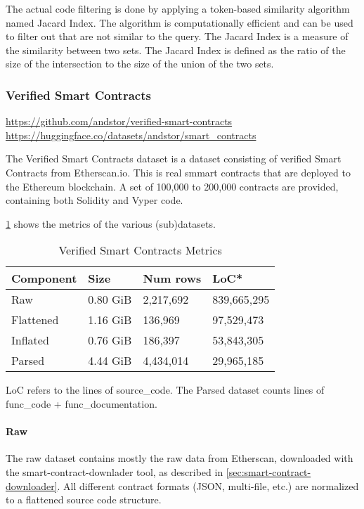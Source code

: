 The actual code filtering is done by applying a token-based similarity algorithm named Jacard Index. The algorithm is computationally efficient and can be used to filter out  that are not similar to the query. The Jacard Index is a measure of the similarity between two sets. The Jacard Index is defined as the ratio of the size of the intersection to the size of the union of the two sets.

\subsubsection{Verified Smart Contracts}
\label{sec:verified-smart-contracts}
\url{https://github.com/andstor/verified-smart-contracts}
\url{https://huggingface.co/datasets/andstor/smart_contracts}

The Verified Smart Contracts dataset is a dataset consisting of verified Smart Contracts from Etherscan.io. This is real smmart contracts that are deployed to the Ethereum blockchain. A set of 100,000 to 200,000 contracts are provided, containing both Solidity and Vyper code.

\cref{tab:verified-smart-contracts-metrics} shows the metrics of the various (sub)datasets.

\begin{table}
    \def\arraystretch{1.5}
    \small
    \centering
    \caption{Verified Smart Contracts Metrics}
    \label{tab:verified-smart-contracts-metrics}
    \begin{tabularx}{\textwidth}{XXXX}
        \toprule
        \textbf{Component} & \textbf{Size} &  \textbf{Num rows} & \textbf{LoC*}\\
        \midrule
        Raw & 0.80 GiB & 2,217,692 & 839,665,295\\
        Flattened & 1.16 GiB & 136,969 & 97,529,473\\
        Inflated & 0.76 GiB & 186,397 & 53,843,305\\
        Parsed & 4.44 GiB & 4,434,014 & 29,965,185\\
        \bottomrule
    \end{tabularx}
\end{table}

LoC refers to the lines of source\_code. The Parsed dataset counts lines of func\_code + func\_documentation.

\paragraph{Raw}
\label{sec:verified-smart-contracts-raw}
The raw dataset contains mostly the raw data from Etherscan, downloaded with the smart-contract-downlader tool, as described in \cref{sec:smart-contract-downloader}. All different contract formats (JSON, multi-file, etc.) are normalized to a flattened source code structure. 

